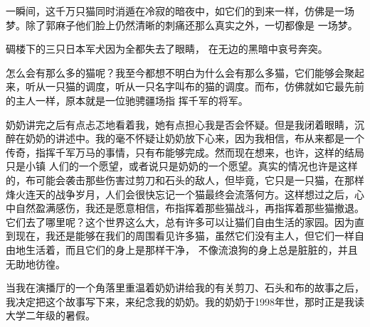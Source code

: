 \documentclass{article}
\begin{document}
一瞬间，这千万只猫同时消遁在冷寂的暗夜中，如它们的到来一样，仿佛是一场梦。除了郭麻子他们脸上仍然清晰的刺痛还那么真实之外，一切都像是
一场梦。 

碉楼下的三只日本军犬因为全都失去了眼睛，
在无边的黑暗中哀号奔突。 

怎么会有那么多的猫呢？我至今都想不明白为什么会有那么多猫，它们能够会聚起来，听从一只猫的调度，听从一只名字叫布的猫的调度。而布，仿佛就如它最先前的主人一样，原本就是一位驰骋疆场指
挥千军的将军。 

奶奶讲完之后有点忐忑地看着我，她有点担心我是否会怀疑。但是我闭着眼睛，沉醉在奶奶的讲述中。我的毫不怀疑让奶奶放下心来，因为我相信，布从来都是一个传奇，指挥千军万马的事情，只有布能够完成。然而现在想来，也许，这样的结局只是小镇
\newpage
人们的一个愿望，或者说只是奶奶的一个愿望。真实的情况也许是这样的，布可能会袭击那些伤害过剪刀和石头的敌人，但毕竟，它只是一只猫，在那样烽火连天的战争岁月，人们会很快忘记一个猫最终会流落何方。这样想过之后，心中自然盈满感伤，我还是愿意相信，布指挥着那些猫战斗，再指挥着那些猫撤退。它们去了哪里呢？这个世界这么大，总有许多可以让猫们自由生活的家园。因为直到现在，我还是能够在我们的周围看见许多猫，虽然它们没有主人，但它们一样自由地生活着，而且它们的身上是那样干净，
不像流浪狗的身上总是脏脏的，并且无助地彷徨。 

当我在演播厅的一个角落里重温着奶奶讲给我的有关剪刀、石头和布的故事之后，我决定把这个故事写下来，来纪念我的奶奶。我的奶奶于1998年世，那时正是我读大学二年级的暑假。
\end{document}
